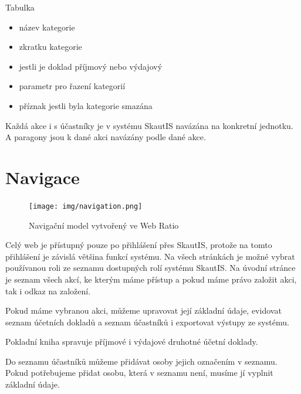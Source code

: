 \documentclass[thesis=B,czech]{FITthesis}[2011/06/14]
\begin{document}
Tabulka  
 \begin{itemize}
 	\item název kategorie
 	\item zkratku kategorie
 	\item jestli je doklad příjmový nebo výdajový
 	\item parametr pro řazení kategorií
 	\item příznak jestli byla kategorie smazána 
\end{itemize}
Každá akce i s účastníky je v systému SkautIS navázána na konkretní jednotku. A paragony jsou k dané akci navázány podle  dané akce. 

\section{Navigace}
 \begin{figure}[h] \centering
 	\texttt{[image: img/navigation.png]}
 	\caption[Navigační model]{Navigační model vytvořený ve Web Ratio}\label{fig:navigation-diagram}
 \end{figure}

Celý web je přístupný pouze po přihlášení přes SkautIS, protože na tomto přihlášení je závislá většina funkcí systému. Na všech stránkách je možné vybrat používanou roli ze seznamu dostupných rolí systému SkautIS. Na úvodní stránce je seznam všech akcí, ke kterým máme přístup a pokud máme právo založit akci, tak i odkaz na založení.

Pokud máme vybranou akci, můžeme upravovat její základní údaje, evidovat seznam účetních dokladů a seznam účastníků i exportovat výstupy ze systému.

Pokladní kniha spravuje příjmové i výdajové druhotné účetní doklady. 

Do seznamu účastníků můžeme přidávat osoby jejich označením v seznamu. Pokud potřebujeme přidat osobu, která v seznamu není, musíme jí vyplnit základní údaje.
\end{document}
